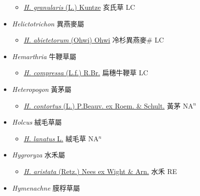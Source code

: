 \begin{itemize}
  \begin{itemize}
        \item[] \href{http://www.theplantlist.org/tpl1.1/search?q=Hackelochloa+granularis}{\textit{H. granularis} (L.) Kuntze}   亥氏草 LC
  \end{itemize}
 \item[] \textit{Helictotrichon} 異燕麥屬
                    
  \begin{itemize}
        \item[] \href{http://www.theplantlist.org/tpl1.1/search?q=Helictotrichon+abietetorum}{\textit{H. abietetorum} (Ohwi) Ohwi}   冷杉異燕麥\# LC
  \end{itemize}
 \item[] \textit{Hemarthria} 牛鞭草屬
                    
  \begin{itemize}
        \item[] \href{http://www.theplantlist.org/tpl1.1/search?q=Hemarthria+compressa}{\textit{H. compressa} (L.f.) R.Br.}   扁穗牛鞭草 LC
  \end{itemize}
 \item[] \textit{Heteropogon} 黃茅屬
                    
  \begin{itemize}
        \item[] \href{http://www.theplantlist.org/tpl1.1/search?q=Heteropogon+contortus}{\textit{H. contortus} (L.) P.Beauv. ex Roem. \& Schult.}   黃茅 NA$^n$
  \end{itemize}
 \item[] \textit{Holcus} 絨毛草屬
                    
  \begin{itemize}
        \item[] \href{http://www.theplantlist.org/tpl1.1/search?q=Holcus+lanatus}{\textit{H. lanatus} L.}   絨毛草 NA$^n$
  \end{itemize}
 \item[] \textit{Hygroryza} 水禾屬
                    
  \begin{itemize}
        \item[] \href{http://www.theplantlist.org/tpl1.1/search?q=Hygroryza+aristata}{\textit{H. aristata} (Retz.) Nees ex Wight \& Arn.}   水禾 RE
  \end{itemize}
 \item[] \textit{Hymenachne} 膜稃草屬
                    

\end{itemize}
